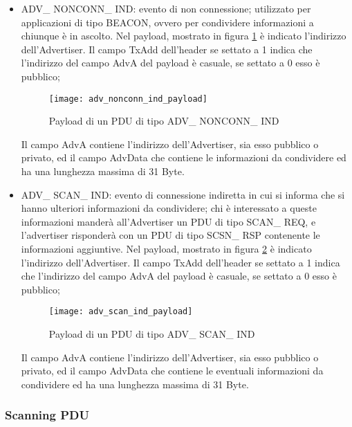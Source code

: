 \begin{itemize}
\item ADV\_ NONCONN\_ IND: evento di non connessione; utilizzato per applicazioni di tipo BEACON, ovvero per condividere informazioni a chiunque è in ascolto. Nel  payload, mostrato in figura \ref{adv_nonconn_ind_payload} è indicato l'indirizzo dell'Advertiser. Il campo TxAdd dell'header se settato a 1 indica che l'indirizzo del campo AdvA del payload è casuale, se settato a 0 esso è pubblico;

\begin{figure}[H]
\texttt{[image: adv\_nonconn\_ind\_payload]}
\centering
\caption{Payload di un PDU di tipo ADV\_ NONCONN\_ IND }
\label{adv_nonconn_ind_payload}
\end{figure}

Il campo AdvA contiene l'indirizzo dell'Advertiser, sia esso pubblico o privato, ed il campo AdvData che contiene le informazioni da condividere ed ha una lunghezza massima di 31 Byte.

\item ADV\_ SCAN\_ IND: evento di connessione indiretta in cui si informa che si hanno ulteriori informazioni da condividere; chi è interessato a queste informazioni manderà all'Advertiser un PDU di tipo SCAN\_ REQ, e l'advertiser risponderà con un PDU di tipo SCSN\_ RSP contenente le informazioni aggiuntive. Nel  payload, mostrato in figura \ref{adv_scan_ind_payload} è indicato l'indirizzo dell'Advertiser. Il campo TxAdd dell'header se settato a 1 indica che l'indirizzo del campo AdvA del payload è casuale, se settato a 0 esso è pubblico;

\begin{figure}[H]
\texttt{[image: adv\_scan\_ind\_payload]}
\centering
\caption{Payload di un PDU di tipo ADV\_ SCAN\_ IND }
\label{adv_scan_ind_payload}
\end{figure}

Il campo AdvA contiene l'indirizzo dell'Advertiser, sia esso pubblico o privato, ed il campo AdvData che contiene le eventuali informazioni da condividere ed ha una lunghezza massima di 31 Byte.

\end{itemize}

\subsubsection{Scanning PDU}

